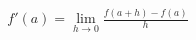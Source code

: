\documentclass[preview]{standalone}
\begin{document}
\begin{align*}
f'(a) = \lim_{h \to 0} \frac{f(a+h) - f(a)}{h}
\end{align*}
\end{document}
